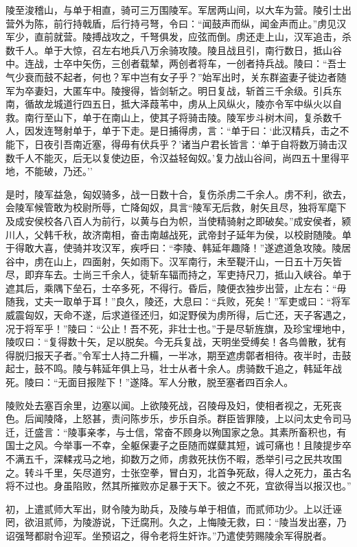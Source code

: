 \documentclass[]{article}
\begin{document}
陵至浚稽山，与单于相直，骑可三万围陵军。军居两山间，以大车为营。陵引士出营外为陈，前行持戟盾，后行持弓弩，令曰：``闻鼓声而纵，闻金声而止。''虏见汉军少，直前就营。陵搏战攻之，千弩俱发，应弦而倒。虏还走上山，汉军追击，杀数千人。单于大惊，召左右地兵八万余骑攻陵。陵且战且引，南行数日，抵山谷中。连战，士卒中矢伤，三创者载辇，两创者将车，一创者持兵战。陵曰：``吾士气少衰而鼓不起者，何也？军中岂有女子乎？''始军出时，关东群盗妻子徙边者随军为卒妻妇，大匿车中。陵搜得，皆剑斩之。明日复战，斩首三千余级。引兵东南，循故龙城道行四五日，抵大泽葭苇中，虏从上风纵火，陵亦令军中纵火以自救。南行至山下，单于在南山上，使其子将骑击陵。陵军步斗树木间，复杀数千人，因发连弩射单于，单于下走。是日捕得虏，言：``单于曰：`此汉精兵，击之不能下，日夜引吾南近塞，得毋有伏兵乎？'诸当户君长皆言：`单于自将数万骑击汉数千人不能灭，后无以复使边臣，令汉益轻匈奴。'复力战山谷间，尚四五十里得平地，不能破，乃还。''

是时，陵军益急，匈奴骑多，战一日数十合，复伤杀虏二千余人。虏不利，欲去，会陵军候管敢为校尉所辱，亡降匈奴，具言``陵军无后救，射矢且尽，独将军麾下及成安侯校各八百人为前行，以黄与白为帜，当使精骑射之即破矣。''成安侯者，颍川人，父韩千秋，故济南相，奋击南越战死，武帝封子延年为侯，以校尉随陵。单于得敢大喜，使骑并攻汉军，疾呼曰：``李陵、韩延年趣降！''遂遮道急攻陵。陵居谷中，虏在山上，四面射，矢如雨下。汉军南行，未至鞮汗山，一日五十万矢皆尽，即弃车去。士尚三千余人，徒斩车辐而持之，军吏持尺刀，抵山入峡谷。单于遮其后，乘隅下垒石，士卒多死，不得行。昏后，陵便衣独步出营，止左右：``毋随我，丈夫一取单于耳！''良久，陵还，大息曰：``兵败，死矣！''军吏或曰：``将军威震匈奴，天命不遂，后求道径还归，如浞野侯为虏所得，后亡还，天子客遇之，况于将军乎！''陵曰：``公止！吾不死，非壮士也。''于是尽斩旌旗，及珍宝埋地中，陵叹曰：``复得数十矢，足以脱矣。今无兵复战，天明坐受缚矣！各鸟兽散，犹有得脱归报天子者。''令军士人持二升糒，一半冰，期至遮虏鄣者相待。夜半时，击鼓起士，鼓不鸣。陵与韩延年俱上马，壮士从者十余人。虏骑数千追之，韩延年战死。陵曰：``无面目报陛下！''遂降。军人分散，脱至塞者四百余人。

陵败处去塞百余里，边塞以闻。上欲陵死战，召陵母及妇，使相者视之，无死丧色。后闻陵降，上怒甚，责问陈步乐，步乐自杀。群臣皆罪陵，上以问太史令司马迁，迁盛言：``陵事亲孝，与士信，常奋不顾身以殉国家之急。其素所畜积也，有国士之风。今举事一不幸，全躯保妻子之臣随而媒糵其短，诚可痛也！且陵提步卒不满五千，深輮戎马之地，抑数万之师，虏救死扶伤不暇，悉举引弓之民共攻围之。转斗千里，矢尽道穷，士张空拳，冒白刃，北首争死敌，得人之死力，虽古名将不过也。身虽陷败，然其所摧败亦足暴于天下。彼之不死，宜欲得当以报汉也。''

初，上遣贰师大军出，财令陵为助兵，及陵与单于相值，而贰师功少。上以迁诬罔，欲沮贰师，为陵游说，下迁腐刑。久之，上悔陵无救，曰：``陵当发出塞，乃诏强弩都尉令迎军。坐预诏之，得令老将生奸诈。''乃遣使劳赐陵余军得脱者。
\end{document}
